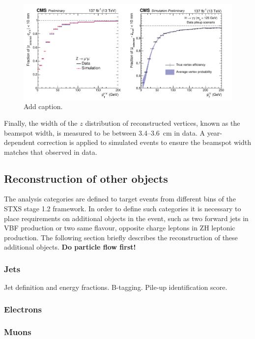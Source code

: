 \begin{figure}[hptb]
  \centering
  \includegraphics[width=1\textwidth]{Figures/hgg_overview/vertex_assignment_0.pdf}
  \caption[Vertex-assignment and vertex-probability BDT]
  {
    Add caption.
  }
  \label{fig:vertex_selection_0}
\end{figure}

Finally, the width of the $z$ distribution of reconstructed vertices, known as the beamspot width, is measured to be between 3.4--3.6~cm in data. A year-dependent correction is applied to simulated events to ensure the beamspot width matches that observed in data.

\subsection{Reconstruction of other objects}
The analysis categories are defined to target events from different bins of the STXS stage 1.2 framework. In order to define such categories it is necessary to place requirements on additional objects in the event, such as two forward jets in VBF production or two same flavour, opposite charge leptons in ZH leptonic production. The following section briefly describes the reconstruction of these additional objects. \textbf{Do particle flow first!}

\subsubsection{Jets}
Jet definition and energy fractions. B-tagging. Pile-up identification score.

\subsubsection{Electrons}

\subsubsection{Muons}

